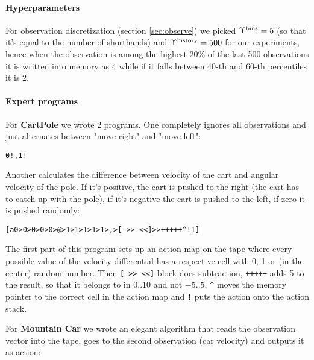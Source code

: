 \paragraph{Hyperparameters}

For observation discretization (section \ref{sec:observe}) we picked $\Upsilon^\text{bins}=5$ (so that it's equal to the number of shorthands) and $\Upsilon^\text{history}=500$ for our experiments, hence when the observation is among the highest 20\% of the last 500 observations it is written into memory as 4 while if it falls between 40-th and 60-th percentiles it is 2.

\paragraph{Expert programs}
\label{sec:expert-progs}

For \textbf{CartPole} we wrote 2 programs. 
One completely ignores all observations and just alternates between "move right" and "move left":

\begin{center}
\begin{lstlisting}
0!,1!
\end{lstlisting}
\end{center}

Another calculates the difference between velocity of the cart and angular velocity of the pole.
If it's positive, the cart is pushed to the right (the cart has to catch up with the pole), if it's negative the cart is pushed to the left, if zero it is pushed randomly:

\begin{center}
\begin{lstlisting}
[a0>0>0>0>0>@>1>1>1>1>1>,>[->>-<<]>>+++++^!1]
\end{lstlisting}
\end{center}

The first part of this program sets up an action map on the tape where every possible value of the velocity differential has a respective cell with 0, 1 or (in the center) random number.
Then \verb|[->>-<<]| block does subtraction, \verb|+++++| adds 5 to the result, so that it belongs to in $0..10$ and not $-5..5$, \verb|^| moves the memory pointer to the correct cell in the action map and \verb|!| puts the action onto the action stack.

For \textbf{Mountain Car} we wrote an elegant algorithm that reads the observation vector into the tape, goes to the second observation (car velocity) and outputs it as action:

